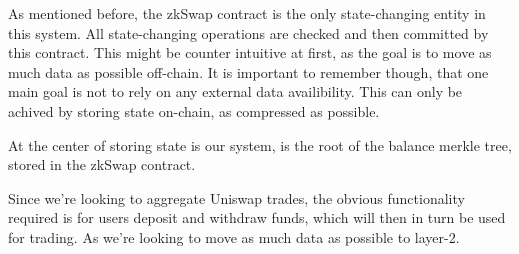 \documentclass[../../thesis.tex]{subfiles}
\begin{document}
As mentioned before, the zkSwap contract is the only state-changing entity in this system. All state-changing operations are checked and then committed by this contract. This might be counter intuitive at first, as the goal is to move as much data as possible off-chain. It is important to remember though, that one main goal is not to rely on any external data availibility. This can only be achived by storing state on-chain, as compressed as possible. 

At the center of storing state is our system, is the root of the balance merkle tree, stored in the zkSwap contract. 


Since we're looking to aggregate Uniswap trades, the obvious functionality required is for users deposit and withdraw funds, which will then in turn be used for trading. As we're looking to move as much data as possible to layer-2. 
\end{document}
